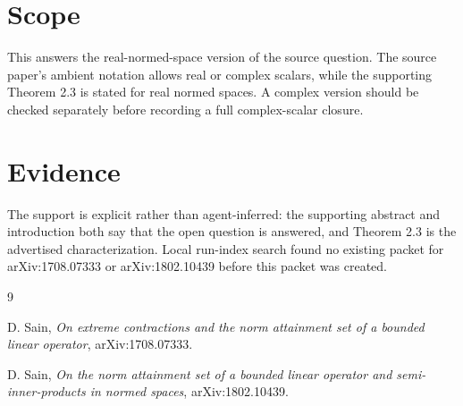 \documentclass[11pt]{article}
\begin{document}
\section*{Scope}

This answers the real-normed-space version of the source question.  The source
paper's ambient notation allows real or complex scalars, while the supporting
Theorem 2.3 is stated for real normed spaces.  A complex version should be
checked separately before recording a full complex-scalar closure.

\section*{Evidence}

The support is explicit rather than agent-inferred: the supporting abstract
and introduction both say that the open question is answered, and Theorem 2.3
is the advertised characterization.  Local run-index search found no existing
packet for arXiv:1708.07333 or arXiv:1802.10439 before this packet was created.

\begin{thebibliography}{9}

D. Sain,
\emph{On extreme contractions and the norm attainment set of a bounded linear
operator},
arXiv:1708.07333.

D. Sain,
\emph{On the norm attainment set of a bounded linear operator and
semi-inner-products in normed spaces},
arXiv:1802.10439.

\end{thebibliography}
\end{document}
